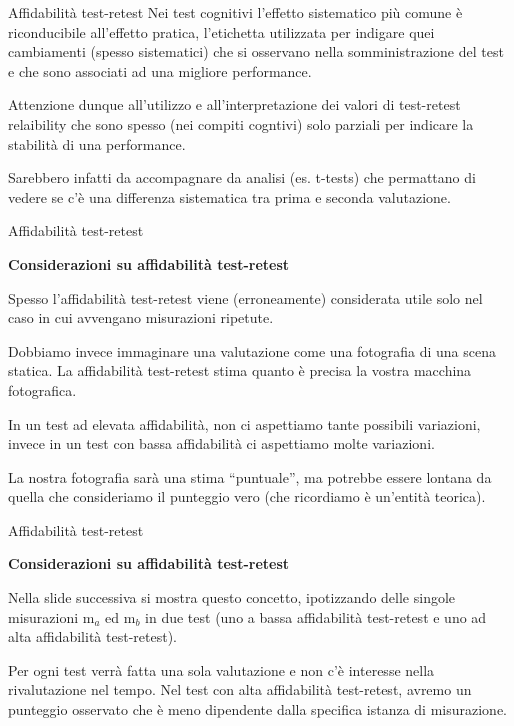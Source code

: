 \documentclass[
  ignorenonframetext,
]{beamer}
\begin{document}
\begin{frame}{Affidabilità test-retest}
\label{affidabilituxe0-test-retest-3}
Nei test cognitivi l'effetto sistematico più comune è riconducibile
all'effetto pratica, l'etichetta utilizzata per indigare quei
cambiamenti (spesso sistematici) che si osservano nella somministrazione
del test e che sono associati ad una migliore performance.

Attenzione dunque all'utilizzo e all'interpretazione dei valori di
test-retest relaibility che sono spesso (nei compiti cogntivi) solo
parziali per indicare la stabilità di una performance.

Sarebbero infatti da accompagnare da analisi (es. t-tests) che
permattano di vedere se c'è una differenza sistematica tra prima e
seconda valutazione.
\end{frame}

\begin{frame}{Affidabilità test-retest}
\label{affidabilituxe0-test-retest-4}
\begin{center}
  \textbf{Considerazioni su affidabilità test-retest}
\end{center}

Spesso l'affidabilità test-retest viene (erroneamente) considerata utile
solo nel caso in cui avvengano misurazioni ripetute.

Dobbiamo invece immaginare una valutazione come una fotografia di una
scena statica. La affidabilità test-retest stima quanto è precisa la
vostra macchina fotografica.

In un test ad elevata affidabilità, non ci aspettiamo tante possibili
variazioni, invece in un test con bassa affidabilità ci aspettiamo molte
variazioni.

La nostra fotografia sarà una stima ``puntuale'', ma potrebbe essere
lontana da quella che consideriamo il punteggio vero (che ricordiamo è
un'entità teorica).
\end{frame}

\begin{frame}{Affidabilità test-retest}
\label{affidabilituxe0-test-retest-5}
\begin{center}
  \textbf{Considerazioni su affidabilità test-retest}
\end{center}

Nella slide successiva si mostra questo concetto, ipotizzando delle
singole misurazioni m\(_a\) ed m\(_b\) in due test (uno a bassa
affidabilità test-retest e uno ad alta affidabilità test-retest).

Per ogni test verrà fatta una sola valutazione e non c'è interesse nella
rivalutazione nel tempo. Nel test con alta affidabilità test-retest,
avremo un punteggio osservato che è meno dipendente dalla specifica
istanza di misurazione.
\end{frame}
\end{document}
